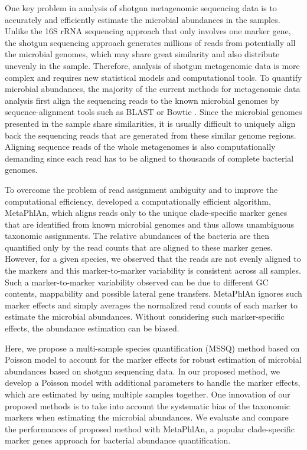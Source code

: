 One key problem in analysis of shotgun metagenomic sequencing data is to accurately and efficiently estimate the microbial abundances in the samples. Unlike the 16S rRNA sequencing approach that only involves one marker gene, the shotgun sequencing approach generates millions of reads from potentially all the microbial genomes, which may share great similarity and also distribute unevenly in the sample. Therefore, analysis of shotgun metagenomic data is more complex and requires new statistical models and computational tools. To quantify microbial abundances, the majority of the current methods for metagenomic data analysis first align the sequencing reads to the known microbial genomes by sequence-alignment tools such as BLAST \citep{altschul1990basic} or Bowtie \citep{Langmead:2009wk}. Since the microbial genomes presented in the sample share similarities, it is usually difficult to uniquely align back the sequencing reads that are generated from these similar genome regions. Aligning sequence reads of the whole metagenomes is also computationally demanding since each read has to be aligned to thousands of complete bacterial genomes.

To overcome the problem of read assignment ambiguity and to improve the computational efficiency, \citet{segata2012metagenomic} developed a computationally efficient algorithm, MetaPhlAn, which aligns reads only to the unique clade-specific marker genes that are identified from known microbial genomes and thus allows unambiguous taxonomic assignments. The relative abundances of the bacteria are then quantified only by the read counts that are aligned to these marker genes. However, for a given species, we observed that the reads are not evenly aligned to the markers and this marker-to-marker variability is consistent across all samples. Such a marker-to-marker variability observed can be due to different GC contents, mappability and possible lateral gene transfers. MetaPhlAn ignores such marker effects and simply averages the normalized read counts of each marker to estimate the microbial abundances. Without considering such marker-specific effects, the abundance estimation can be biased.


Here, we propose a multi-sample species quantification (MSSQ) method based on Poisson model to account for the marker effects for robust estimation of microbial abundances based on shotgun sequencing data. In our proposed method, we develop a Poisson model with additional parameters to handle the marker effects, which are estimated by using multiple samples together. One innovation of our proposed methods is to take into account the systematic bias of the taxonomic markers when estimating the microbial abundances. We evaluate and compare the performances of proposed method with MetaPhlAn, a popular clade-specific marker genes approach for bacterial abundance quantification.



